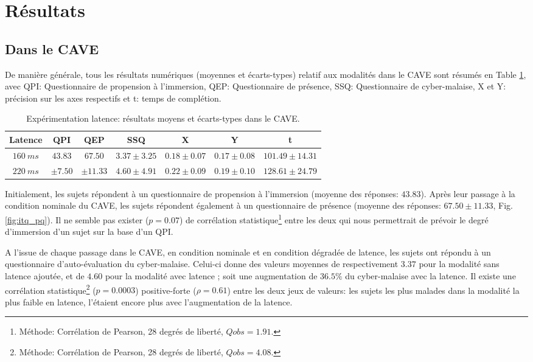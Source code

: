 	\section{Résultats}
	\subsection{Dans le CAVE}
	\par De manière générale, tous les résultats numériques (moyennes et écarts-types) relatif aux modalités dans le CAVE sont résumés en Table \ref{tab:resultats_cave_latence}, avec QPI: Questionnaire de propension à l'immersion, QEP: Questionnaire de présence, SSQ: Questionnaire de cyber-malaise, X et Y: précision sur les axes respectifs et t: temps de complétion.
	
	\begin{table}[h]	
		\centering
		\caption{Expérimentation latence: résultats moyens et écarts-types dans le CAVE.}
		\label{tab:resultats_cave_latence}
		\begin{tabular}{c|c|c|c|c|c|c}
			\textbf{Latence} & \textbf{QPI} & \textbf{QEP} & \textbf{SSQ} & \textbf{X} & \textbf{Y} & \textbf{t}\\ \hline			
			$160~ms$ & $43.83$ & $67.50$ & $3.37 \pm 3.25$ & $0.18 \pm 0.07$ & $0.17 \pm 0.08$ & $101.49 \pm 14.31$\\
			$220~ms$ & $\pm 7.50$ & $\pm 11.33$ & $4.60 \pm 4.91$ & $0.22 \pm 0.09$ & $0.19 \pm 0.10$ & $128.61 \pm 24.79$\\
		\end{tabular}
	\end{table}
	
	\par Initialement, les sujets répondent à un questionnaire de propension à l'immersion (moyenne des réponses: $43.83$).	Après leur passage à la condition nominale du CAVE, les sujets répondent également à un questionnaire de présence (moyenne des réponses: $67.50 \pm 11.33$, Fig. \ref{fig:itq_pq}). Il ne semble pas exister ($p = 0.07$) de corrélation statistique\footnote{Méthode: Corrélation de Pearson, 28 degrés de liberté, $Qobs = 1.91$.} entre les deux qui nous permettrait de prévoir le degré d'immersion d'un sujet sur la base d'un QPI.
	
	\par A l'issue de chaque passage dans le CAVE, en condition nominale et en condition dégradée de latence, les sujets ont répondu à un questionnaire d'auto-évaluation du cyber-malaise. Celui-ci donne des valeurs moyennes de respectivement $3.37$ pour la modalité sans latence ajoutée, et de $4.60$ pour la modalité avec latence ; soit une augmentation de $36.5\%$ du cyber-malaise avec la latence. Il existe une corrélation statistique\footnote{Méthode: Corrélation de Pearson, 28 degrés de liberté, $Qobs = 4.08$.} ($p = 0.0003$) positive-forte ($\rho = 0.61$) entre les deux jeux de valeurs: les sujets les plus malades dans la modalité la plus faible en latence, l'étaient encore plus avec l'augmentation de la latence.
	
